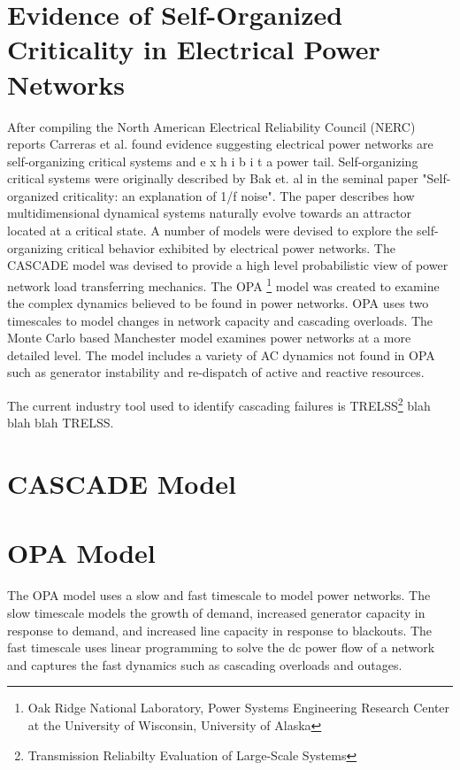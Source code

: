 \section{Evidence of Self-Organized Criticality in Electrical Power Networks}
After compiling the North American Electrical Reliability Council (NERC) reports Carreras et al. found evidence suggesting electrical power networks are self-organizing critical systems and e x h i b i t a power tail.\cite{carreras2000initial, carreras2001evidence} Self-organizing critical systems were originally described by Bak et. al in the seminal paper "Self-organized criticality: an explanation of 1/f noise". The paper describes how multidimensional dynamical systems naturally evolve towards an attractor located at a critical state.\cite{bak1987self} A number of models were devised to explore the self-organizing critical behavior exhibited by electrical power networks. The CASCADE \cite{dobson2002examining} model was devised to provide a high level probabilistic view of power network load transferring mechanics. The OPA \cite{dobson2001initial, carreras2004complex, newman2011exploring} \footnote{Oak Ridge National Laboratory, Power Systems Engineering Research Center at the University of Wisconsin, University of Alaska} model was created to examine the complex dynamics believed to be found in power networks. OPA uses two timescales to model changes in network capacity and cascading overloads. The Monte Carlo based Manchester model examines power networks at a more detailed level. The model includes a variety of AC dynamics not found in OPA such as generator instability and re-dispatch of active and reactive resources.\cite{nedic2006criticality, baldick2009vulnerability} 



 The current industry tool used to identify cascading failures is TRELSS\footnote{Transmission Reliabilty Evaluation of Large-Scale Systems} blah blah blah TRELSS.


\section{CASCADE Model}

\section{OPA Model}
The OPA model uses a slow and fast timescale to model power networks.\cite{carreras2004complex} The slow timescale models the growth of demand, increased generator capacity in response to demand, and increased line capacity in response to blackouts. The fast timescale uses linear programming to solve the dc power flow of a network and captures the fast dynamics such as cascading overloads and outages.\cite{carreras2004complex}

